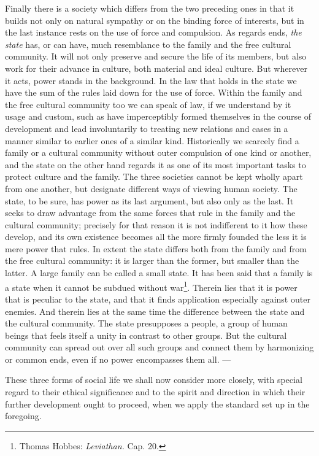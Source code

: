 \documentclass[12pt,a4paper,openany]{book}
\newcommand{\opage}[1]{\marginnote{\footnotesize\textit{[#1]}}}
\begin{document}
Finally there is a society which differs from the two preceding ones in that it builds not only on natural sympathy or
on the binding force of interests, but in the last instance rests on the use of force and compulsion. As regards ends,
\textit{the state} has, or can have, much resemblance to the family and the free cultural community. It will not only
preserve and secure the life of its members, but also work for their advance in culture, both material and ideal
culture. But wherever it acts, power stands in the background. In the law that holds in the state we have the sum of
the rules laid down for the use of force. Within the family and the free cultural community too we can speak of law, if
we understand by it usage and custom, such as have imperceptibly formed themselves in the course of development and
lead involuntarily to treating new relations and cases in a manner similar to earlier ones of a similar kind.
Historically we scarcely find a family or a cultural community without outer compulsion of one kind or another, and the
state on the other hand regards it as one of its most important tasks to protect culture and the family. The three
societies cannot be kept wholly apart from one another, but designate different ways of viewing human society. The
state, to be sure, has power as its last argument, but also only as the last. It seeks to draw advantage from the same
forces that rule in the family and the cultural community; precisely for that reason it is not indifferent to it how
these develop, and its own existence becomes all the more firmly founded the less it is mere power that rules. In
extent the state differs both from the family and from the free cultural community:
\opage{277}it is larger than the former, but smaller than the latter. A large family can be called a small state. It
has been said that a family is a state when it cannot be subdued without war\footnote[1]{Thomas Hobbes:
\textit{Leviathan.} Cap. 20.}. Therein lies that it is power that is peculiar to the state, and that it finds
application especially against outer enemies. And therein lies at the same time the difference between the state and
the cultural community. The state presupposes a people, a group of human beings that feels itself a unity in contrast to
other groups. But the cultural community can spread out over all such groups and connect them by harmonizing or common
ends, even if no power encompasses them all. ---

These three forms of social life we shall now consider more closely, with special regard to their ethical significance
and to the spirit and direction in which their further development ought to proceed, when we apply the standard set up
in the foregoing.
\end{document}
